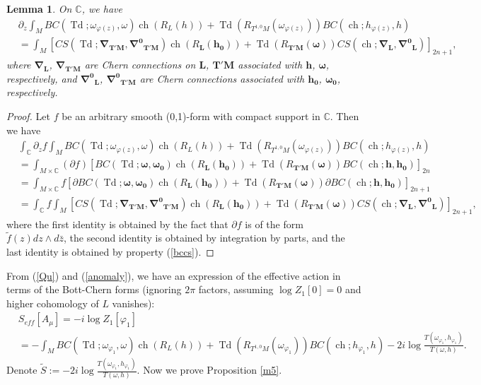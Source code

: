 \documentclass[12pt,reqno,a4paper]{amsart}
\numberwithin{equation}{section}
\def\bz{\bar z}
\def\p{\partial}
\DeclareMathOperator{\Td}{Td}
\DeclareMathOperator{\ch}{ch}
\newtheorem{lem}[theo]{{\sc Lemma}}
\theoremstyle{remark}
\theoremstyle{dotless}
\begin{document}
\begin{lem}\label{tianlem}
On $\mathbb{C}$, we have
\begin{align*}
&\p_z \int_M BC(\Td;\omega_{\varphi(z)},\omega)\ch(R_L(h))+\Td(R_{T^{1,0}M}(\omega_{\varphi(z)}))BC(\ch;h_{\varphi(z)},h) \\
&=\int_M \left[ CS(\Td;\boldsymbol{\nabla}_\mathbf{T'M},\boldsymbol{\nabla^0}_\mathbf{T'M})\ch(R_\mathbf{L}(\mathbf{h_0}))+\Td(R_{\mathbf{T'M}}(\boldsymbol{\omega}))CS(\ch;\boldsymbol{\nabla}_\mathbf{L},\boldsymbol{\nabla^0}_\mathbf{L})\right]_{2n+1},
\end{align*}
where $\boldsymbol{\nabla}_\mathbf{L}$, $\boldsymbol{\nabla}_\mathbf{T'M}$ are Chern connections on $\mathbf{L}$, $\mathbf{T'M}$ associated with $\mathbf{h}$, $\boldsymbol{\omega}$, respectively, and $\boldsymbol{\nabla^0}_\mathbf{L}$, $\boldsymbol{\nabla^0}_\mathbf{T'M}$ are Chern connections associated with $\mathbf{h_0}$, $\boldsymbol{\omega_0}$, respectively.
\end{lem}
\begin{proof}
Let $f$ be an arbitrary smooth (0,1)-form with compact support in $\mathbb{C}$. Then we have
\begin{align*}
&\int_{\mathbb{C}} \p_z f \int_M BC(\Td;\omega_{\varphi(z)},\omega)\ch(R_L(h))+\Td(R_{T^{1,0}M}(\omega_{\varphi(z)}))BC(\ch;h_{\varphi(z)},h) \\
&=\int_{M\times\mathbb{C}} \left(\p f\right) \left[ BC(\Td;\boldsymbol{\omega},\boldsymbol{\omega_0})\ch(R_\mathbf{L}(\mathbf{h_0}))+\Td(R_{\mathbf{T'M}}(\boldsymbol{\omega}))BC(\ch;\mathbf{h},\mathbf{h_0}) \right]_{2n} \\
&=\int_{M\times\mathbb{C}} f\left[ \p BC(\Td;\boldsymbol{\omega},\boldsymbol{\omega_0})\ch(R_\mathbf{L}(\mathbf{h_0})) + \Td(R_{\mathbf{T'M}}(\boldsymbol{\omega}))\p BC(\ch;\mathbf{h},\mathbf{h_0}) \right]_{2n+1} \\
&= \int_{\mathbb{C}} f \int_M \left[ CS(\Td;\boldsymbol{\nabla}_\mathbf{T'M},\boldsymbol{\nabla^0}_\mathbf{T'M})\ch(R_\mathbf{L}(\mathbf{h_0}))+\Td(R_{\mathbf{T'M}}(\boldsymbol{\omega}))CS(\ch;\boldsymbol{\nabla}_\mathbf{L},\boldsymbol{\nabla^0}_\mathbf{L})\right]_{2n+1},
\end{align*}
where the first identity is obtained by the fact that $\p f$ is of the form $\tilde{f}(z)dz\wedge d\bz$, the second identity is obtained by integration by parts, and the last identity is obtained by property (\ref{bccs}).
\end{proof}

From (\ref{Qu}) and (\ref{anomaly}), we have an expression of the effective action in terms of the Bott-Chern forms (ignoring $2\pi$ factors, assuming $\log Z_1[0]=0$ and higher cohomology of $L$ vanishes):
\begin{align}\label{effbc}
&S_{eff}[A_\mu]= -i\log Z_1[\varphi_1]\nonumber \\
&= -\int_M BC(\Td;\omega_{\varphi_1},\omega)\ch(R_{L}(h))+\Td(R_{T^{1,0}M}(\omega_{\varphi_1}))BC(\ch;h_{\varphi_1},h) - 2i\log \frac{T(\omega_{\varphi_1},h_{\varphi_1})}{T(\omega,h)}.
\end{align}
Denote $\widetilde{S}:=-2i\log \frac{T(\omega_{\varphi_1},h_{\varphi_1})}{T(\omega,h)}$. Now we prove Proposition \ref{m5}.
\end{document}
